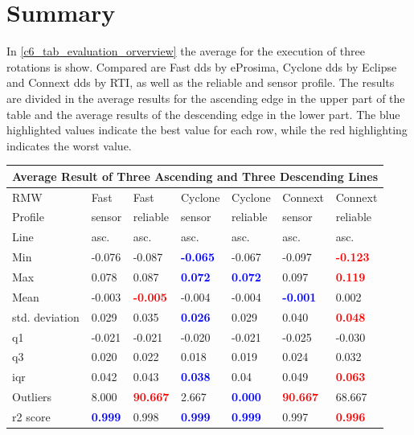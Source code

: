 \section{Summary}
In \autoref{c6_tab_evaluation_orverview} the average for the execution of three rotations is show. Compared are Fast \gls{dds} by eProsima, Cyclone \gls{dds} by Eclipse and Connext \gls{dds} by RTI, as well as the reliable and sensor profile. The results are divided in the average results for the ascending edge in the upper part of the table and the average results of the descending edge in the lower part. The blue highlighted values indicate the best value for each row, while the red highlighting indicates the worst value.
\begin{table}[H]
\begin{tabular}{|l|ll|ll|ll|}
\toprule
\multicolumn{7}{|c|}{Average Result of Three Ascending and Three Descending Lines} \\
\toprule
 RMW & Fast & Fast  & Cyclone & Cyclone & Connext & Connext \\
\midrule
Profile & sensor & reliable & sensor & reliable & sensor & reliable \\
\midrule
Line & asc. & asc. & asc. & asc. & asc. & asc. \\
Min & -0.076 & -0.087 & \textcolor{blue}{\textbf{-0.065}} & -0.067 & -0.097 & \textcolor{red}{\textbf{-0.123}} \\
Max & 0.078 & 0.087 & \textcolor{blue}{\textbf{0.072}} & \textcolor{blue}{\textbf{0.072}} & 0.097 & \textcolor{red}{\textbf{0.119}} \\
Mean & -0.003 & \textcolor{red}{\textbf{-0.005}} & -0.004 & -0.004 & \textcolor{blue}{\textbf{-0.001}} & 0.002 \\
std. deviation & 0.029 & 0.035 & \textcolor{blue}{\textbf{0.026}} & 0.029 & 0.040 & \textcolor{red}{\textbf{0.048}} \\
\gls{q1} & -0.021 & -0.021 & -0.020 & -0.021 & -0.025 & -0.030 \\
\gls{q3} & 0.020 & 0.022 & 0.018 & 0.019 & 0.024 & 0.032 \\
\gls{iqr} & 0.042 & 0.043 & \textcolor{blue}{\textbf{0.038}} & 0.04 & 0.049 & \textcolor{red}{\textbf{0.063}} \\
Outliers & 8.000 & \textcolor{red}{\textbf{90.667}} & 2.667 & \textcolor{blue}{\textbf{0.000}} & \textcolor{red}{\textbf{90.667}} & 68.667 \\
\gls{r2} score & \textcolor{blue}{\textbf{0.999}} & 0.998 & \textcolor{blue}{\textbf{0.999}} & \textcolor{blue}{\textbf{0.999}} & 0.997 & \textcolor{red}{\textbf{0.996}} \\

\end{tabular}
\end{table}
